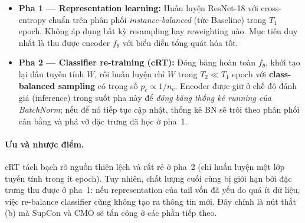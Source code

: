 \begin{itemize}
    \item \textbf{Pha 1 --- Representation learning:}
    Huấn luyện ResNet-18 với cross-entropy chuẩn trên phân phối
    \emph{instance-balanced} (tức Baseline) trong $T_1$ epoch.
    Không áp dụng bất kỳ resampling hay reweighting nào.
    Mục tiêu duy nhất là thu được encoder $f_\theta$ với biểu diễn
    tổng quát hóa tốt.

    \item \textbf{Pha 2 --- Classifier re-training (cRT):}
    Đóng băng hoàn toàn $f_\theta$, khởi tạo lại đầu tuyến tính $W$,
    rồi huấn luyện chỉ $W$ trong $T_2 \ll T_1$ epoch với
    \textbf{class-balanced sampling} có trọng số $p_c \propto 1/n_c$.
    Encoder được giữ ở chế độ đánh giá (inference) trong suốt pha này
    để \emph{đóng băng thống kê running của BatchNorm}; nếu để nó tiếp tục
    cập nhật, thống kê BN sẽ trôi theo phân phối cân bằng và phá vỡ
    đặc trưng đã học ở pha~1.
\end{itemize}

\paragraph{Ưu và nhược điểm.}
cRT tách bạch rõ nguồn thiên lệch và rất rẻ ở pha~2
(chỉ huấn luyện một lớp tuyến tính trong ít epoch).
Tuy nhiên, chất lượng cuối cùng bị giới hạn bởi đặc trưng thu được ở pha~1:
nếu representation của tail vốn đã yếu do quá ít dữ liệu, việc re-balance
classifier cũng không tạo ra thông tin mới.
Đây chính là nút thắt (b) mà SupCon và CMO sẽ tấn công ở các phần tiếp theo.


